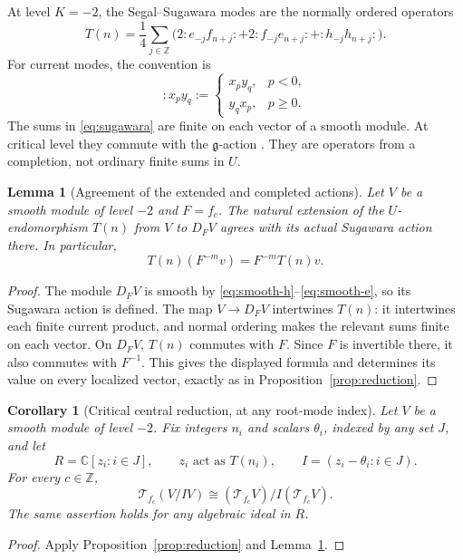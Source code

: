 \documentclass[11pt,a4paper]{article}
\newcommand{\C}{\mathbb C}
\newcommand{\Z}{\mathbb Z}
\newcommand{\g}{\mathfrak g}
\newcommand{\T}{\mathcal T}
\theoremstyle{plainupright}
\newtheorem{lemma}[theorem]{Lemma}
\newtheorem{corollary}[theorem]{Corollary}
\begin{document}
At level \(K=-2\), the Segal--Sugawara modes are the normally ordered
operators
\begin{equation}\label{eq:sugawara}
T(n)=\frac14\sum_{j\in\Z}
\bigl(2:e_{-j}f_{n+j}:
     +2:f_{-j}e_{n+j}:
     +:h_{-j}h_{n+j}:\bigr).
\end{equation}
For current modes, the convention is
\[
:x_p y_q:=
\begin{cases}
x_p y_q,&p<0,\\
y_q x_p,&p\ge0.
\end{cases}
\]
The sums in \eqref{eq:sugawara} are finite on each vector of a smooth
module. At critical level they commute with the \(\g\)-action
\cite[Section 2.5]{FGXZ}.
They are operators from a completion, not ordinary finite sums in \(U\).

\begin{lemma}[Agreement of the extended and completed actions]
\label{lem:completed-action}
Let \(V\) be a smooth module of level \(-2\) and \(F=f_c\).
The natural extension of the \(U\)-endomorphism \(T(n)\) from \(V\)
to \(D_FV\) agrees with its actual Sugawara action there. In particular,
\[
T(n)(F^{-m}v)=F^{-m}T(n)v.
\]
\end{lemma}
\begin{proof}
The module \(D_FV\) is smooth by
\eqref{eq:smooth-h}--\eqref{eq:smooth-e}, so its Sugawara action is
defined. The map \(V\to D_FV\) intertwines \(T(n)\): it intertwines
each finite current product, and normal ordering makes the relevant
sums finite on each vector.
On \(D_FV\), \(T(n)\) commutes with \(F\).
Since \(F\) is invertible there, it also commutes with \(F^{-1}\).
This gives the displayed formula and determines its value on every
localized vector, exactly as in Proposition~\ref{prop:reduction}.
\end{proof}

\begin{corollary}[Critical central reduction, at any root-mode index]
\label{cor:critical-reduction}
Let \(V\) be a smooth module of level \(-2\). Fix integers \(n_i\)
and scalars \(\theta_i\), indexed by any set \(J\), and let
\[
R=\C[z_i:i\in J],\qquad z_i\text{ act as }T(n_i),\qquad
I=(z_i-\theta_i:i\in J).
\]
For every \(c\in\Z\),
\[
\boxed{\quad
\T_{f_c}(V/IV)\cong(\T_{f_c}V)/I(\T_{f_c}V).
\quad}
\]
The same assertion holds for any algebraic ideal in \(R\).
\end{corollary}
\begin{proof}
Apply Proposition~\ref{prop:reduction} and
Lemma~\ref{lem:completed-action}.
\end{proof}
\end{document}

